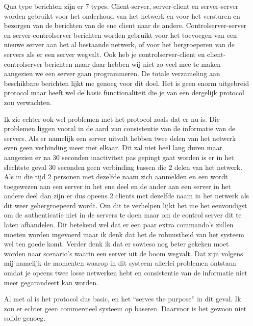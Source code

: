 \documentclass[a4paper,10pt]{article}
\begin{document}
Qua type berichten zijn er 7 types. Client-server, server-client en server-server worden gebruikt voor het onderhoud van het netwerk en voor het versturen en bezorgen van de berichten van de ene client naar de andere. Controlserver-server en server-controlserver berichten worden gebruikt voor het toevoegen van een nieuwe server aan het al bestaande netwerk, of voor het hergroeperen van de servers als er een server wegvalt. Ook heb je controlserver-client en client-controlserver berichten maar daar hebben wij niet zo veel mee te maken aangezien we een server gaan programmeren. De totale verzameling aan beschikbare berichten lijkt me genoeg voor dit doel. Het is geen enorm uitgebreid protocol maar heeft wel de basic functionaliteit die je van een dergelijk protocol zou verwachten.

Ik zie echter ook wel problemen met het protocol zoals dat er nu is. Die problemen liggen vooral in de aard van consistentie van de informatie van de servers. Als er namelijk een server uitvalt hebben twee delen van het netwerk even geen verbinding meer met elkaar. Dit zal niet heel lang duren maar aangezien er na 30 seconden inactiviteit pas gepingt gaat worden is er in het slechtste geval 30 seconden geen verbinding tussen die 2 delen van het netwerk. Als in die tijd 2 personen met dezelfde naam zich aanmelden en een wordt toegewezen aan een server in het ene deel en de ander aan een server in het andere deel dan zijn er dus opeens 2 clients met dezelfde naam in het netwerk als dit weer gehergroepeerd wordt. Om dit te verhelpen lijkt het me het eenvoudigst om de authenticatie niet in de servers te doen maar om de control server dit te laten afhandelen. Dit betekend wel dat er een paar extra commando’s zullen moeten worden ingevoerd maar ik denk dat het de robuustheid van het systeem wel ten goede komt. Verder denk ik dat er sowieso nog beter gekeken moet worden naar scenario’s waarin een server uit de boom wegvalt. Dat zijn volgens mij namelijk de momenten waarop in dit systeem allerlei problemen ontstaan omdat je opeens twee losse netwerken hebt en consistentie van de informatie niet meer gegarandeert kan worden.

Al met al is het protocol dus basic, en het “serves the purpose” in dit geval. Ik zou er echter geen commercieel systeem op baseren. Daarvoor is het gewoon niet solide genoeg.
\end{document}
